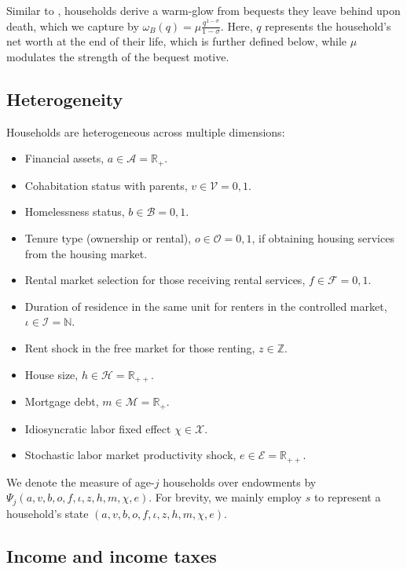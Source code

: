 \documentclass[parskip=full]{article}
\begin{document}
Similar to \citet{cagetti-denardi-2006}, households derive a warm-glow from bequests they leave behind upon death, which we capture by $\omega_{B}(q)=\mu \frac{q^{1-\sigma}}{1-\sigma}$. Here, $q$ represents the household's net worth at the end of their life, which is further defined below, while $\mu$ modulates the strength of the bequest motive.

\subsection{Heterogeneity}

Households are heterogeneous across multiple dimensions:

\begin{itemize}
    \item Financial assets, $a\in \mathcal{A}=\mathbb{R}_{+}$.
    \item Cohabitation status with parents, $v\in \mathcal{V}={0,1}$.
    \item Homelessness status, $b \in \mathcal{B}={0,1}$.
    \item Tenure type (ownership or rental), $o \in \mathcal{O}={0,1}$, if obtaining housing services from the housing market.
    \item Rental market selection for those receiving rental services, $f \in \mathcal{F}={0,1}$.
    \item Duration of residence in the same unit for renters in the controlled market, $\iota \in \mathcal{I}=\mathbb{N}$.
    \item Rent shock in the free market for those renting, $z \in \mathbb{Z}$.
    \item House size, $h\in \mathcal{H}=\mathbb{R}_{++}$.
    \item Mortgage debt, $m \in \mathcal{M}=\mathbb{R}_{+}$.
    \item Idiosyncratic labor fixed effect $\chi \in \mathcal{X}$.
    \item Stochastic labor market productivity shock, $e \in \mathcal{E} = \mathbb{R}_{++}$.
\end{itemize}
 
\noindent We denote the measure of age-$j$ households over endowments by $\Psi_{j}(a,v,b,o,f,\iota,z,h,m,\chi,e)$. For brevity, we mainly employ $s$ to represent a household's state $(a,v,b,o,f,\iota,z,h,m,\chi,e)$.

\subsection{Income and income taxes}\label{subsection:income}
\end{document}
